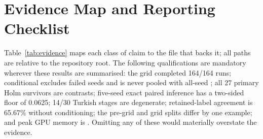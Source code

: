 \section{Evidence Map and Reporting Checklist}
\label{app:evidence}
Table~\ref{tab:evidence} maps each class of claim to the file that backs it; all paths are relative to the repository root. The following qualifications are mandatory wherever these results are summarised: the grid completed 164/164 runs; conditional \Fone{} excludes failed seeds and is never pooled with all-seed \Fone; all 27 primary Holm survivors are \xlmr{} contrasts; five-seed exact paired inference has a two-sided floor of 0.0625; 14/30 \xlmxv{} Turkish stages are degenerate; retained-label agreement is 65.67\% without conditioning; the pre-grid and grid splits differ by one example; and peak GPU memory is \NM. Omitting any of these would materially overstate the evidence.

